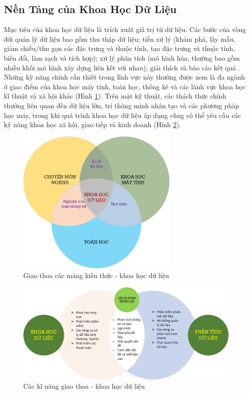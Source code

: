 \documentclass[utf8]{frontiersSCNS} %
\begin{document}
\subsection{Nền Tảng của Khoa Học Dữ Liệu}
Mục tiêu của khoa học dữ liệu là trích xuất giá trị từ dữ liệu. Các bước của vòng đời quản lý dữ liệu bao gồm thu thập dữ liệu; tiền xử lý (khám phá, lấy mẫu, giảm chiều/thu gọn các đặc trưng và thuộc tính, tạo đặc trưng và thuộc tính, biến đổi, làm sạch và tích hợp); xử lý phân tích (mô hình hóa, thường bao gồm nhiều khối mô hình xây dựng liên kết với nhau); giải thích và báo cáo kết quả \citep{Aggarwal2015}. Những kỹ năng chính cần thiết trong lĩnh vực này thường được xem là đa ngành ở giao điểm của khoa học máy tính, toán học, thống kê và các lãnh vực khoa học kĩ thuật và xã hội khác (Hình \ref{fig:khoahocdulieu01}). Trên mặt kỹ thuật, các thách thức chính thường liên quan đến dữ liệu lớn, trí thông minh nhân tạo và các phương pháp học máy, trong khi quá trình khoa học dữ liệu áp dụng cũng có thể yêu cầu các kỹ năng khoa học xã hội, giao tiếp và kinh doanh (Hình \ref{fig:khoahocdulieu02}).

\begin{figure}[h!]
	\centering
	\begin{center}
		\includegraphics[width=8cm]{khoahocdulieu01}%
	\end{center}
	\caption{Giao thoa các mảng kiến thức - khoa học dữ liệu}\label{fig:khoahocdulieu01}
\end{figure}


\begin{figure}[h!]
	\centering
	\begin{center}
		\includegraphics[width=\textwidth]{khoahocdulieu02}%
	\end{center}
	\caption{Các kĩ năng giao thoa - khoa học dữ liệu}\label{fig:khoahocdulieu02}
\end{figure}
\end{document}
